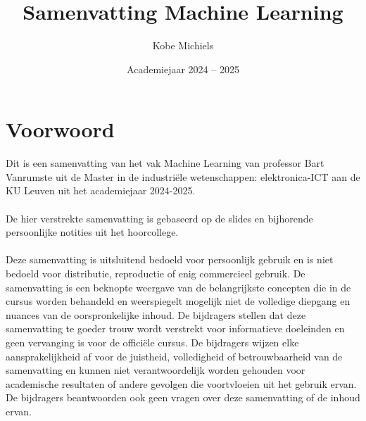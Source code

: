 \documentclass[kul]{kulakarticle} %
\title{Samenvatting Machine Learning}
\author{Kobe Michiels}
\date{Academiejaar 2024 -- 2025}
\begin{document}
	
	\maketitle
	
	\section*{Voorwoord}
	
	Dit is een samenvatting van het vak Machine Learning van professor Bart Vanrumste uit de Master in de industriële wetenschappen: elektronica-ICT aan de KU Leuven uit het academiejaar 2024-2025.  
	\\\\
	De hier verstrekte samenvatting is gebaseerd op de slides en bijhorende persoonlijke notities uit het hoorcollege.
	\\\\
	Deze samenvatting is uitsluitend bedoeld voor persoonlijk gebruik en is niet bedoeld voor distributie, reproductie of enig commercieel gebruik. De samenvatting is een beknopte weergave van de belangrijkste concepten die in de cursus worden behandeld en weerspiegelt mogelijk niet de volledige diepgang en nuances van de oorspronkelijke inhoud. De bijdragers stellen dat deze samenvatting te goeder trouw wordt verstrekt voor informatieve doeleinden en geen vervanging is voor de officiële cursus. De bijdragers wijzen elke aansprakelijkheid af voor de juistheid, volledigheid of betrouwbaarheid van de samenvatting en kunnen niet verantwoordelijk worden gehouden voor academische resultaten of andere gevolgen die voortvloeien uit het gebruik ervan. De bijdragers beantwoorden ook geen vragen over deze samenvatting of de inhoud ervan.
	
	\setcounter{tocdepth}{2}
	\tableofcontents
	
		\newpage
		
		
		
		
		
		
		
		
\end{document}
